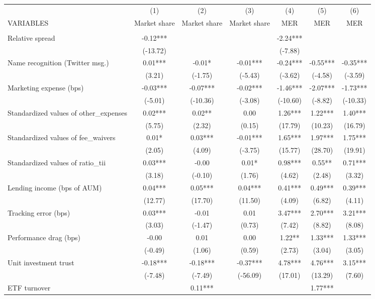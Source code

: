 \documentclass[]{article}
\begin{document}
\begin{tabular}{lcccccc} \hline
 & (1) & (2) & (3) & (4) & (5) & (6) \\
VARIABLES & Market share & Market share & Market share & MER & MER & MER \\ \hline
 &  &  &  &  &  &  \\
Relative spread & -0.12*** &  &  & -2.24*** &  &  \\
 & (-13.72) &  &  & (-7.88) &  &  \\
Name recognition (Twitter msg.) & 0.01*** & -0.01* & -0.01*** & -0.24*** & -0.55*** & -0.35*** \\
 & (3.21) & (-1.75) & (-5.43) & (-3.62) & (-4.58) & (-3.59) \\
Marketing expense (bps) & -0.03*** & -0.07*** & -0.02*** & -1.46*** & -2.07*** & -1.73*** \\
 & (-5.01) & (-10.36) & (-3.08) & (-10.60) & (-8.82) & (-10.33) \\
Standardized values of other\_expenses & 0.02*** & 0.02** & 0.00 & 1.26*** & 1.22*** & 1.40*** \\
 & (5.75) & (2.32) & (0.15) & (17.79) & (10.23) & (16.79) \\
Standardized values of fee\_waivers & 0.01* & 0.03*** & -0.01*** & 1.65*** & 1.97*** & 1.75*** \\
 & (2.05) & (4.09) & (-3.75) & (15.77) & (28.70) & (19.91) \\
Standardized values of ratio\_tii & 0.03*** & -0.00 & 0.01* & 0.98*** & 0.55** & 0.71*** \\
 & (3.18) & (-0.10) & (1.76) & (4.62) & (2.48) & (3.32) \\
Lending income (bps of AUM) & 0.04*** & 0.05*** & 0.04*** & 0.41*** & 0.49*** & 0.39*** \\
 & (12.77) & (17.70) & (11.50) & (4.09) & (6.82) & (4.11) \\
Tracking error (bps) & 0.03*** & -0.01 & 0.01 & 3.47*** & 2.70*** & 3.21*** \\
 & (3.03) & (-1.47) & (0.73) & (7.42) & (8.82) & (8.08) \\
Performance drag (bps) & -0.00 & 0.01 & 0.00 & 1.22** & 1.33*** & 1.33*** \\
 & (-0.49) & (1.06) & (0.59) & (2.73) & (3.04) & (3.05) \\
Unit investment trust & -0.18*** & -0.18*** & -0.37*** & 4.78*** & 4.76*** & 3.15*** \\
 & (-7.48) & (-7.49) & (-56.09) & (17.01) & (13.29) & (7.60) \\
ETF turnover &  & 0.11*** &  &  & 1.77*** &  \\

\end{tabular}
\end{document}
